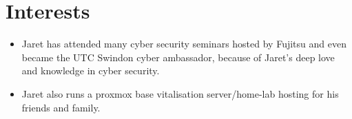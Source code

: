 \section*{Interests}
\begin{itemize}
    \item Jaret has attended many cyber security seminars hosted by Fujitsu and even became the UTC Swindon cyber ambassador, because of Jaret’s deep love and knowledge in cyber security.
    \item Jaret also runs a proxmox base vitalisation server/home-lab hosting for his friends and family.
\end{itemize}